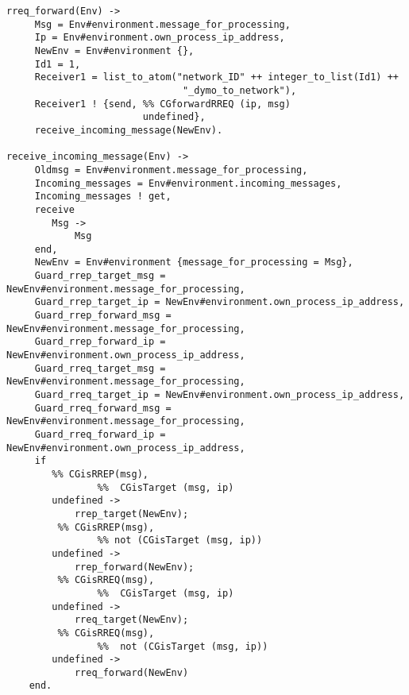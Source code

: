 \begin{verbatim}
rreq_forward(Env) -> 
     Msg = Env#environment.message_for_processing,
     Ip = Env#environment.own_process_ip_address,
     NewEnv = Env#environment {},
     Id1 = 1,
     Receiver1 = list_to_atom("network_ID" ++ integer_to_list(Id1) ++
                               "_dymo_to_network"),
     Receiver1 ! {send, %% CGforwardRREQ (ip, msg)
                        undefined},
     receive_incoming_message(NewEnv).

receive_incoming_message(Env) -> 
     Oldmsg = Env#environment.message_for_processing,
     Incoming_messages = Env#environment.incoming_messages,
     Incoming_messages ! get,
     receive 
        Msg -> 
            Msg
     end,
     NewEnv = Env#environment {message_for_processing = Msg},
     Guard_rrep_target_msg = NewEnv#environment.message_for_processing,
     Guard_rrep_target_ip = NewEnv#environment.own_process_ip_address,
     Guard_rrep_forward_msg = NewEnv#environment.message_for_processing,
     Guard_rrep_forward_ip = NewEnv#environment.own_process_ip_address,
     Guard_rreq_target_msg = NewEnv#environment.message_for_processing,
     Guard_rreq_target_ip = NewEnv#environment.own_process_ip_address,
     Guard_rreq_forward_msg = NewEnv#environment.message_for_processing,
     Guard_rreq_forward_ip = NewEnv#environment.own_process_ip_address,
     if
        %% CGisRREP(msg),
                %%  CGisTarget (msg, ip)
        undefined ->
            rrep_target(NewEnv);
         %% CGisRREP(msg),
                %% not (CGisTarget (msg, ip))
        undefined ->
            rrep_forward(NewEnv);
         %% CGisRREQ(msg), 
                %%  CGisTarget (msg, ip)
        undefined ->
            rreq_target(NewEnv);
         %% CGisRREQ(msg),
                %%  not (CGisTarget (msg, ip))
        undefined ->
            rreq_forward(NewEnv)
    end.
\end{verbatim}
\normalsize